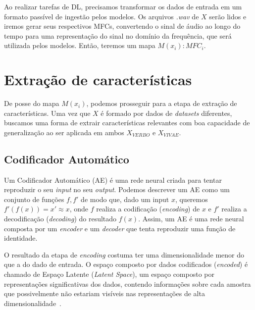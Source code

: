 Ao realizar tarefas de \acrshort{DL}, precisamos transformar os dados de entrada em um formato passível de ingestão pelos modelos. Os arquivos \textit{.wav} de $X$ serão lidos e iremos gerar seus respectivos \acrshort{MFC}s, convertendo o sinal de áudio ao longo do tempo para uma representação do sinal no domínio da frequência, que será utilizada pelos modelos. Então, teremos um mapa $M(x_i): MFC_i$.


\section{Extração de características}

De posse do mapa $M(x_i)$, podemos prosseguir para a etapa de extração de características. Uma vez que $X$ é formado por dados de \textit{datasets} diferentes, buscamos uma forma de extrair características relevantes com boa capacidade de generalização ao ser aplicada em ambos $X_{VERBO}$ e $X_{VIVAE}$.

\subsection{Codificador Automático}

Um Codificador Automático (\acrshort{AE}) é uma rede neural criada para tentar reproduzir o seu \textit{input} no seu \textit{output}. Podemos descrever um \acrshort{AE} como um conjunto de funções $f, f'$ de modo que, dado um input $x$, queremos $f'(f(x)) = x' \approx x$, onde $f$ realiza a codificação (\textit{encoding}) de $x$ e $f'$ realiza a decodificação (\textit{decoding}) do resultado $f(x)$. Assim, um \acrlong{AE} é uma rede neural composta por um \textit{encoder} e um \textit{decoder} que tenta reproduzir uma função de identidade.


O resultado da etapa de \textit{encoding} costuma ter uma dimensionalidade menor do que a do dado de entrada. O espaço composto por dados codificados (\textit{encoded}) é chamado de Espaço Latente (\textit{Latent Space}), um espaço composto por representações significativas dos dados, contendo informações sobre cada amostra que possivelmente não estariam visíveis nas representações de alta dimensionalidade~\cite{60}.

